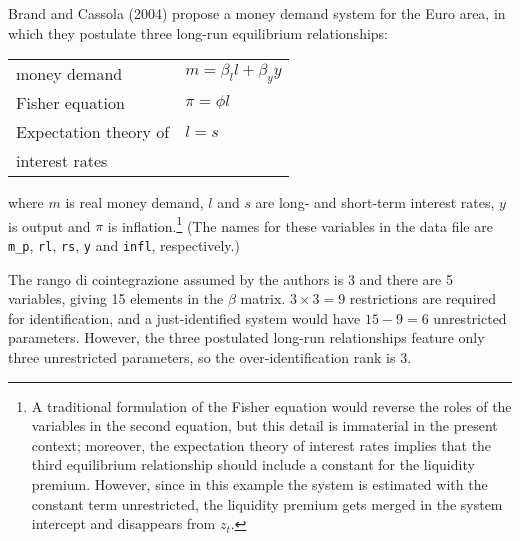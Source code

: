 Brand and Cassola (2004) propose a money demand system for the Euro
area, in which they postulate three long-run equilibrium
relationships:
%
\begin{center}
\begin{tabular}{ll}
  money demand & $m = \beta_l l + \beta_y y$ \\
  Fisher equation & $\pi = \phi l$ \\
  Expectation theory of & $l = s$ \\ [-4pt]
  interest rates
\end{tabular}
\end{center}
%
where $m$ is real money demand, $l$ and $s$ are long- and short-term
interest rates, $y$ is output and $\pi$ is inflation.\footnote{A
  traditional formulation of the Fisher equation would reverse the
  roles of the variables in the second equation, but this detail is
  immaterial in the present context; moreover, the expectation theory
  of interest rates implies that the third equilibrium relationship
  should include a constant for the liquidity premium. However, since
  in this example the system is estimated with the constant term
  unrestricted, the liquidity premium gets merged in the system
  intercept and disappears from $z_t$.}  (The names for these
variables in the  data file are \verb|m_p|, \texttt{rl},
\texttt{rs}, \texttt{y} and \texttt{infl}, respectively.)

The rango di cointegrazione assumed by the authors is 3 and there are 5
variables, giving 15 elements in the $\beta$ matrix.  $3 \times 3 = 9$
restrictions are required for identification, and a just-identified
system would have $15 - 9 = 6$ unrestricted parameters.  However, the
three postulated long-run relationships feature only three
unrestricted parameters, so the over-identification rank is 3.

